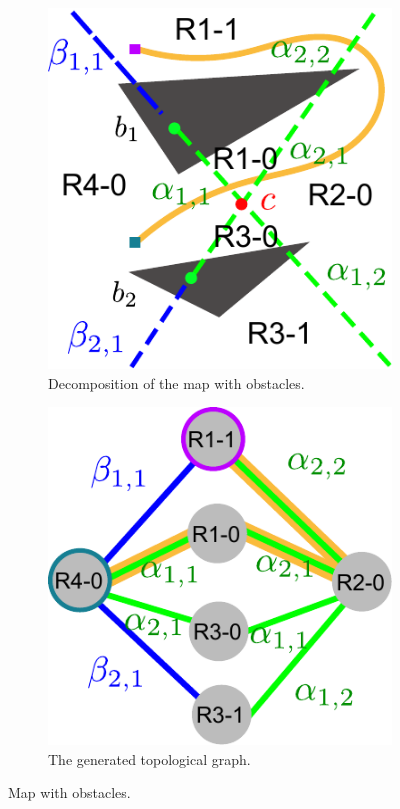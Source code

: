 \documentclass[letterpaper, 10 pt, conference]{ieeeconf}
\begin{document}
\begin{figure}[htbp]
	\centering
	\begin{subfigure}[t]{0.45\linewidth}
		\centering
		\includegraphics[width=\textwidth]{fig/obs_map.pdf}
		\caption{Decomposition of the map with obstacles.}
		\label{fig:obs_map:map}
	\end{subfigure}  
	\begin{subfigure}[t]{0.5\linewidth}
		\centering
		\includegraphics[width=\textwidth]{fig/obs_topology.pdf}
		\caption{The generated topological graph.}
		\label{fig:obs_map:topology}
	\end{subfigure}   
	\caption{Map with obstacles.}
	\label{fig:obs_map}
\end{figure}
\end{document}
